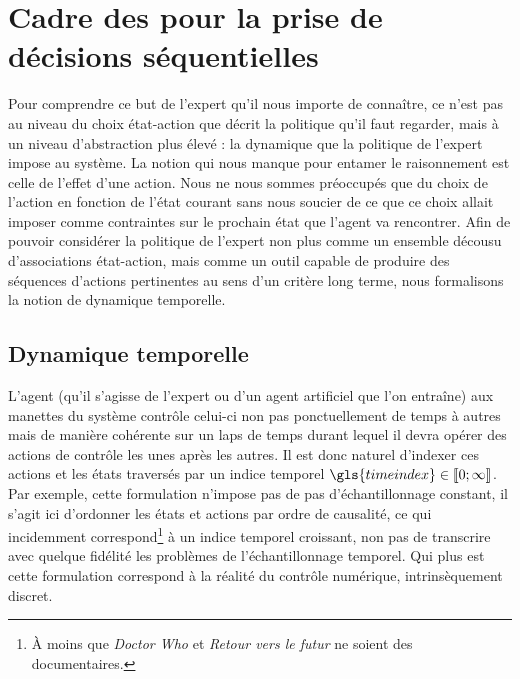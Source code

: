 \documentclass[frenchb,a4paper,justified,notoc]{tufte-book}
\newcommand{\timeindex}{\gls{timeindex}}
\begin{document}
\section{Cadre des  pour la prise de décisions séquentielles}
\label{sec-2-2}
\label{hier-cadre}

Pour comprendre ce but de l'expert qu'il nous importe de connaître, ce n'est pas au niveau du choix état-action que décrit la politique qu'il faut regarder, mais à un niveau d'abstraction plus élevé : la dynamique que la politique de l'expert impose au système. La notion qui nous manque pour entamer le raisonnement est celle de l'effet d'une action. Nous ne nous sommes préoccupés que du choix de l'action en fonction de l'état courant sans nous soucier de ce que ce choix allait imposer comme contraintes sur le prochain état que l'agent va rencontrer. Afin de pouvoir considérer la politique de l'expert non plus comme un ensemble décousu d'associations état-action, mais comme un outil capable de produire des séquences d'actions pertinentes au sens d'un critère long terme, nous formalisons la notion de dynamique temporelle.
\subsection{Dynamique temporelle}
\label{sec-2-2-1}
\label{hier-tempdyn}


L'agent (qu'il s'agisse de l'expert ou d'un agent artificiel que l'on entraîne) aux manettes du système contrôle celui-ci non pas ponctuellement de temps à autres mais de manière cohérente sur un laps de temps durant lequel il devra opérer des actions de contrôle les unes après les autres. Il est donc naturel d'indexer ces actions et les états traversés par un indice temporel $\timeindex \in \llbracket 0;\infty\rrbracket$. Par exemple, cette formulation n'impose pas de pas d'échantillonnage constant, il s'agit ici d'ordonner les états et actions par ordre de causalité, ce qui incidemment correspond\footnote{\`A moins que \emph{Doctor Who} et \emph{Retour vers le futur} ne soient des documentaires.
 } à un indice temporel croissant, non pas de transcrire avec quelque fidélité les problèmes de l'échantillonnage temporel. Qui plus est cette formulation correspond à la réalité du contrôle numérique, intrinsèquement discret.
\end{document}
